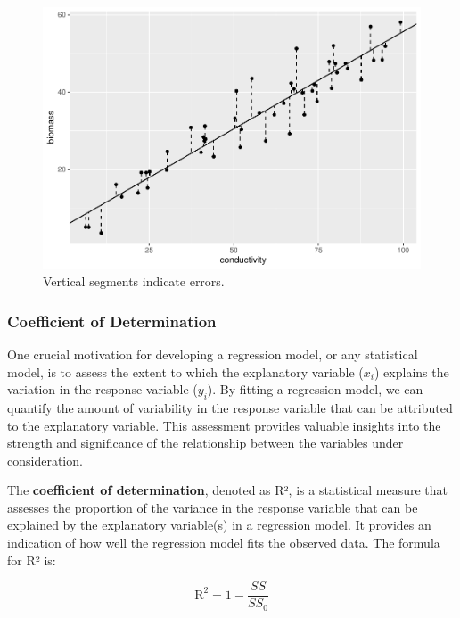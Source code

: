 \documentclass[
]{article}
\begin{document}
\begin{figure}

{\centering \includegraphics{biostats_files/figure-latex/geom-errors-1} 

}

\caption{Vertical segments indicate errors.}\label{fig:geom-errors}
\end{figure}

\hypertarget{coefficient-of-determination}{%
\subsubsection{Coefficient of Determination}\label{coefficient-of-determination}}

One crucial motivation for developing a regression model, or any statistical model, is to assess the extent to which the explanatory variable (\(x_i\)) explains the variation in the response variable (\(y_i\)). By fitting a regression model, we can quantify the amount of variability in the response variable that can be attributed to the explanatory variable. This assessment provides valuable insights into the strength and significance of the relationship between the variables under consideration.

The \textbf{coefficient of determination}, denoted as R², is a statistical measure that assesses the proportion of the variance in the response variable that can be explained by the explanatory variable(s) in a regression model. It provides an indication of how well the regression model fits the observed data. The formula for R² is:

\[
\text{R}^2 = 1 - \frac{SS}{SS_0}
\]
\end{document}
